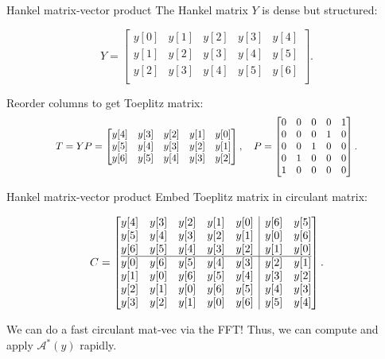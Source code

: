 \documentclass[xcolor=dvipsnames,t]{beamer} %
\newcommand\scalemath[2]{\scalebox{#1}{\mbox{\ensuremath{\displaystyle #2}}}}
\begin{document}
\begin{frame}{Hankel matrix-vector product}
   The Hankel matrix $Y$ is dense but structured:

   \[ Y = \begin{bmatrix} y[0] & y[1] & y[2] & y[3] & y[4]\\
                          y[1] & y[2] & y[3] & y[4] & y[5]\\
                          y[2] & y[3] & y[4] & y[5] & y[6]\\\end{bmatrix}. \] 
   
   Reorder columns to get Toeplitz matrix:
   \[\scalemath{0.9}{ T = YP = \begin{bmatrix}
                               y[4] & y[3] & y[2] & y[1] & y[0]\\
                               y[5] & y[4] & y[3] & y[2] & y[1]\\
                               y[6] & y[5] & y[4] & y[3] & y[2]\\\end{bmatrix}, 
              \quad P = \begin{bmatrix} 0 & 0 & 0 & 0 & 1\\
                                        0 & 0 & 0 & 1 & 0\\
                                        0 & 0 & 1 & 0 & 0\\
                                        0 & 1 & 0 & 0 & 0\\
                                        1 & 0 & 0 & 0 & 0\\ \end{bmatrix}. }\] 
\end{frame}

\begin{frame}{Hankel matrix-vector product}
   Embed Toeplitz matrix in circulant matrix:
   
   \[ C = \left[\begin{array}{@{}ccccc|cc@{}}
            y[4] & y[3] & y[2] & y[1] & y[0] & y[6] & y[5]\\
            y[5] & y[4] & y[3] & y[2] & y[1] & y[0] & y[6]\\
            y[6] & y[5] & y[4] & y[3] & y[2] & y[1] & y[0]\\
            \hline
            y[0] & y[6] & y[5] & y[4] & y[3] & y[2] & y[1]\\
            y[1] & y[0] & y[6] & y[5] & y[4] & y[3] & y[2]\\
            y[2] & y[1] & y[0] & y[6] & y[5] & y[4] & y[3]\\
            y[3] & y[2] & y[1] & y[0] & y[6] & y[5] & y[4]\\
   \end{array}\right]. \] 

   \noindent We can do a fast circulant mat-vec via the FFT!  Thus, we can compute and apply $\mathcal{A}^\ast(y)$ rapidly.

\end{frame}
\end{document}
